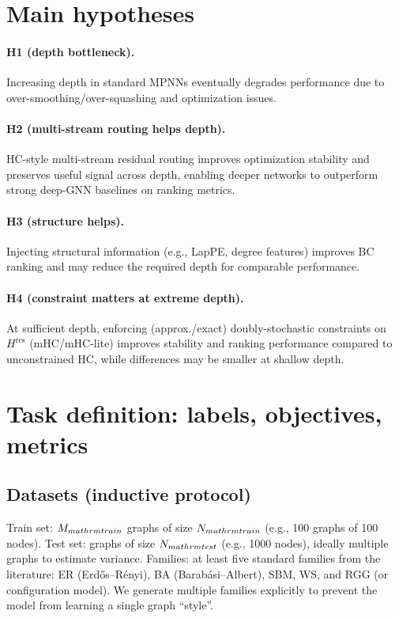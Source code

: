 \documentclass[11pt]{article}
\begin{document}
\section{Main hypotheses}
\paragraph{H1 (depth bottleneck).}
Increasing depth in standard MPNNs eventually degrades performance due to over-smoothing/over-squashing and optimization issues.

\paragraph{H2 (multi-stream routing helps depth).}
HC-style multi-stream residual routing improves optimization stability and preserves useful signal across depth, enabling deeper networks to outperform strong deep-GNN baselines on ranking metrics.

\paragraph{H3 (structure helps).}
Injecting structural information (e.g., LapPE, degree features) improves BC ranking and may reduce the required depth for comparable performance.

\paragraph{H4 (constraint matters at extreme depth).}
At sufficient depth, enforcing (approx./exact) doubly-stochastic constraints on $H^{\mathrm{res}}$ (mHC/mHC-lite) improves stability and ranking performance compared to unconstrained HC, while differences may be smaller at shallow depth.

\section{Task definition: labels, objectives, metrics}
\subsection{Datasets (inductive protocol)}
Train set: $M_{\\mathrm{train}}$ graphs of size $N_{\\mathrm{train}}$ (e.g., 100 graphs of 100 nodes).
Test set: graphs of size $N_{\\mathrm{test}}$ (e.g., 1000 nodes), ideally multiple graphs to estimate variance.
Families: at least five standard families from the literature: ER (Erd\H{o}s--R\'enyi), BA (Barab\'asi--Albert), SBM, WS, and RGG (or configuration model).
We generate multiple families explicitly to prevent the model from learning a single graph “style”.
\end{document}
